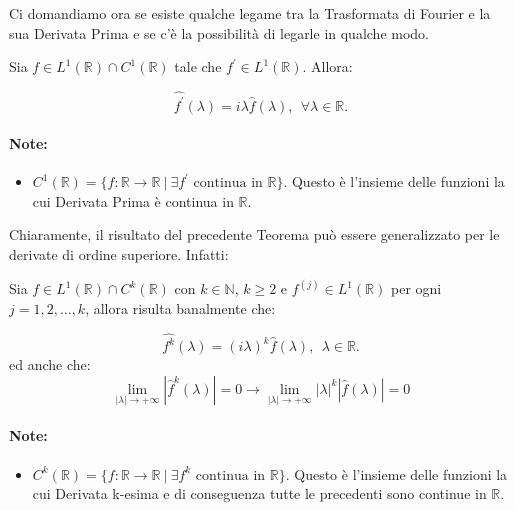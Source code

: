 Ci domandiamo ora se esiste qualche legame tra la Trasformata di Fourier e la
sua Derivata Prima e se c'è la possibilità di legarle in qualche modo.

\begin{theorem}
    Sia $f \in L^1(\mathbb{R}) \cap C^1(\mathbb{R})$ tale che $f^{\prime} \in
        L^1(\mathbb{R})$. Allora:

    $$
        \widehat{f^{\prime}}(\lambda) = i \lambda \hat{f}(\lambda), \ \ \forall
        \lambda \in \mathbb{R}.
    $$
\end{theorem}

\paragraph{Note:}
\begin{itemize}
    \item $C^1(\mathbb{R}) = \{ f: \mathbb{R} \rightarrow \mathbb{R} \ | \
              \exists f^{\prime} \text{ continua in } \mathbb{R} \}$. Questo è
          l'insieme delle funzioni la cui Derivata Prima è continua in
          $\mathbb{R}$.
\end{itemize}

Chiaramente, il risultato del precedente Teorema può essere generalizzato per le
derivate di ordine superiore. Infatti:

\begin{theorem}
    Sia $f \in L^1(\mathbb{R}) \cap C^k(\mathbb{R})$ con $k \in \mathbb{N}$, $k
        \geq 2$ e $f^{\left(j\right)} \in L^1(\mathbb{R})$ per ogni $j = 1, 2,
        \ldots, k$, allora risulta banalmente che:

    $$
        \widehat{f^k}(\lambda) = (i \lambda)^k \hat{f}(\lambda), \ \ \lambda \in
        \mathbb{R}.
    $$
    ed anche che:
    $$
        \lim_{ |\lambda| \rightarrow +\infty } \left| \hat{f}^k(\lambda) \right| = 0 \rightarrow
        \lim_{ |\lambda| \rightarrow +\infty } \left|\lambda\right|^k\left| \hat{f}(\lambda) \right| = 0
    $$
\end{theorem}

\paragraph{Note:}
\begin{itemize}
    \item $C^k(\mathbb{R}) = \{ f: \mathbb{R} \rightarrow \mathbb{R} \ | \
              \exists f^{k} \text{ continua in } \mathbb{R} \}$. Questo è
          l'insieme delle funzioni la cui Derivata k-esima e di conseguenza tutte le precedenti sono continue in
          $\mathbb{R}$.
\end{itemize}

